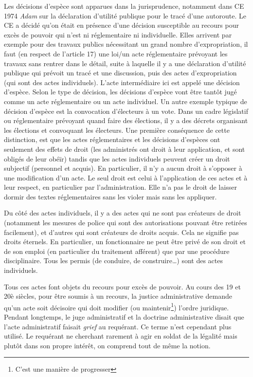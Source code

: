 \documentclass[math]{cours}
\begin{document}
Les décisions d'espèce sont apparues dans la jurisprudence, notamment dans CE 1974 \emph{Adam} sur la déclaration d'utilité publique pour le tracé d'une autoroute. Le CE a décidé qu'on était en présence d'une décision susceptible au recours pour excès de pouvoir qui n'est ni réglementaire ni individuelle.
Elles arrivent par exemple pour des travaux publics nécessitant un grand nombre d'expropriation, il faut (en respect de l'article 17) une loi/un acte réglementaire prévoyant les travaux sans rentrer dans le détail, suite à laquelle il y a une déclaration d'utilité publique qui prévoit un tracé et une discussion, puis des actes d'expropriation (qui sont des actes individuels).
L'acte intermédiaire ici est appelé une décision d'espèce.
Selon le type de décision, les décisions d'espèce vont être tantôt jugé comme un acte réglementaire ou un acte individuel.
Un autre exemple typique de décision d'espèce est la convocation d'électeurs à un vote. Dans un cadre législatif ou réglementaire prévoyant quand faire des élections, il y a des décrets organisant les élections et convoquant les électeurs.
Une première conséquence de cette distinction, est que les actes réglementaires et les décisions d'espèces ont seulement des effets de droit (les administrés ont droit à leur application, et sont obligés de leur obéïr) tandis que les actes individuels peuvent créer un droit subjectif (personnel et acquis).
En particulier, il n'y a aucun droit à s'opposer à une modification d'un acte.
Le seul droit est celui à l'application de ces actes et à leur respect, en particulier par l'administration. Elle n'a pas le droit de laisser dormir des textes réglementaires sans les violer mais sans les appliquer.

Du côté des actes individuels, il y a des actes qui ne sont pas créateurs de droit (notamment les mesures de police qui sont des autorisations pouvant être retirées facilement), et d'autres qui sont créateurs de droits acquis.
Cela ne signifie pas droits éternels.
En particulier, un fonctionnaire ne peut être privé de son droit et de son emploi (en particulier du traitement afférent) que par une procédure disciplinaire.
Tous les permis (de conduire, de construire\ldots) sont des actes individuels.

Tous ces actes font objets du recours pour excès de pouvoir.
Au cours des 19 et 20è siècles, pour être soumis à un recours, la justice administrative demande qu'un acte soit décisoire qui doit modifier (ou maintenir\footnote{C'est une manière de progresser}) l'ordre juridique.
Pendant longtemps, le juge administratif et la doctrine administrative disait que l'acte administratif faisait \emph{grief} au requérant.
Ce terme n'est cependant plus utilisé.
Le requérant ne cherchant rarement à agir en soldat de la légalité mais plutôt dans son propre intérêt, on comprend tout de même la notion.
\end{document}

